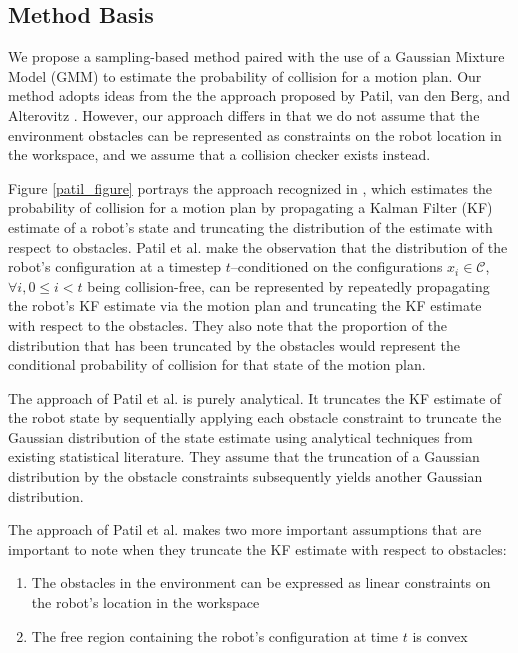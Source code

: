 \documentclass[journal]{IEEEtran}
\begin{document}
\subsection{Method Basis}

We propose a sampling-based method paired with the use of a Gaussian Mixture Model (GMM) to estimate the probability of collision for a motion plan. Our method adopts ideas from the the approach proposed by Patil, van den Berg, and Alterovitz \cite{IEEEhowto:patil}. However, our approach differs in that we do not assume that the environment obstacles can be represented as constraints on the robot location in the workspace, and we assume that a collision checker exists instead.

Figure \ref{patil_figure} portrays the approach recognized in \cite{IEEEhowto:patil}, which estimates the probability of collision for a motion plan by propagating a Kalman Filter (KF) estimate of a robot's state and truncating the distribution of the estimate with respect to obstacles. Patil et al. make the observation that the distribution of the robot's configuration at a timestep $t$--conditioned on the configurations $x_i \in \mathcal{C}$, $\forall i, 0 \leq i < t $ being collision-free, can be represented by repeatedly propagating the robot's KF estimate via the motion plan and truncating the KF estimate with respect to the obstacles. They also note that the proportion of the distribution that has been truncated by the obstacles would represent the conditional probability of collision for that state of the motion plan.

The approach of Patil et al. is purely analytical. It truncates the KF estimate of the robot state by sequentially applying each obstacle constraint to truncate the Gaussian distribution of the state estimate using analytical techniques from existing statistical literature. They assume that the truncation of a Gaussian distribution by the obstacle constraints subsequently yields another Gaussian distribution.

The approach of Patil et al. makes two more important assumptions that are important to note when they truncate the KF estimate with respect to obstacles:
\begin{enumerate}
  \item The obstacles in the environment can be expressed as linear constraints on the robot's location in the workspace
  \item The free region containing the robot's configuration at time $t$ is convex
\end{enumerate}
\end{document}
